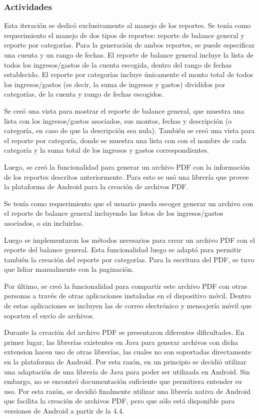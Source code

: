 \subsubsection{Actividades}
Esta iteración se dedicó exclusivamente al manejo de los reportes. Se tenía como requerimiento el manejo de dos tipos de reportes: reporte de balance general y reporte por categorías. Para la generación de ambos reportes, se puede especificar una cuenta y un rango de fechas. El reporte de balance general incluye la lista de todos los ingresos/gastos de la cuenta escogida, dentro del rango de fechas establecido. El reporte por categorías incluye únicamente el monto total de todos los ingresos/gastos (es decir, la suma de ingresos y gastos) divididos por categorías, de la cuenta y rango de fechas escogidos.

Se creó una vista para mostrar el reporte de balance general, que muestra una lista con los ingresos/gastos asociados, sus montos, fechas y descripción (o categoría, en caso de que la descripción sea nula). También se creó una vista para el reporte por categoría, donde se muestra una lista con con el nombre de cada categoría y la suma total de los ingresos y gastos correspondientes.

Luego, se creó la funcionalidad para generar un archivo PDF con la información de los reportes descritos anteriormente. Para esto se usó una librería que provee la plataforma de Android para la creación de archivos PDF.  

Se tenía como requerimiento que el usuario pueda escoger generar un archivo con el reporte de balance general incluyendo las fotos de los ingresos/gastos asociados, o sin incluirlas.

Luego se implementaron los métodos necesarios para crear un archivo PDF con el reporte del balance general. Esta funcionalidad luego se adaptó para permitir también la creación del reporte por categorías. Para la escritura del PDF, se tuvo que lidiar manualmente con la paginación. 

Por último, se creó la funcionalidad para compartir este archivo PDF con otras personas a través de otras aplicaciones instaladas en el dispositivo móvil. Dentro de estas aplicaciones se incluyen las de correo electrónico y mensajería móvil que soporten el envío de archivos.

Durante la creación del archivo PDF se presentaron diferentes dificultades. En primer lugar, las librerías existentes en Java para generar archivos con dicha extension hacen uso de otras librerías, las cuales no son soportadas directamente en la plataforma de Android. Por esta razón, en un principio se decidió utilizar una adaptación de una librería de Java para poder ser utilizada en Android. Sin embargo, no se encontró documentación suficiente que permitiera entender su uso. Por esta razón, se decidió finalmente utilizar una librería nativa de Android que facilita la creación de archivos PDF, pero que sólo está disponible para versiones de Android a partir de la 4.4. %


